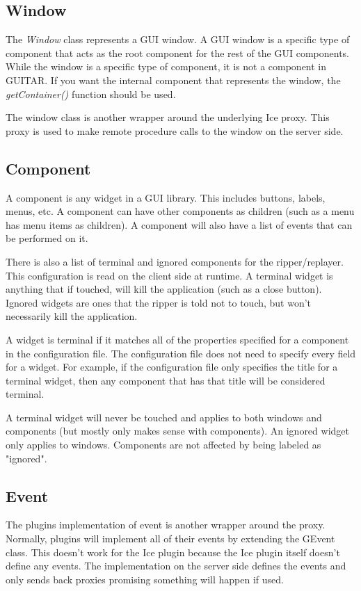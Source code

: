 \subsection{Window}

The \emph{Window} class represents a GUI window. A GUI window is a specific type of component that acts as the root component for the rest of the GUI components. While the window is a specific type of component, it is not a component in GUITAR. If you want the internal component that represents the window, the \emph{getContainer()} function should be used.

The window class is another wrapper around the underlying Ice proxy. This proxy is used to make remote procedure calls to the window on the server side.

\subsection{Component}

A component is any widget in a GUI library. This includes buttons, labels, menus, etc. A component can have other components as children (such as a menu has menu items as children). A component will also have a list of events that can be performed on it.

There is also a list of terminal and ignored components for the ripper/replayer. This configuration is read on the client side at runtime. A terminal widget is anything that if touched, will kill the application (such as a close button). Ignored widgets are ones that the ripper is told not to touch, but won't necessarily kill the application.

A widget is terminal if it matches all of the properties specified for a component in the configuration file. The configuration file does not need to specify every field for a widget. For example, if the configuration file only specifies the title for a terminal widget, then any component that has that title will be considered terminal.

A terminal widget will never be touched and applies to both windows and components (but mostly only makes sense with components). An ignored widget only applies to windows. Components are not affected by being labeled as "ignored".

\subsection{Event}

The plugins implementation of event is another wrapper around the proxy. Normally, plugins will implement all of their events by extending the GEvent class. This doesn't work for the Ice plugin because the Ice plugin itself doesn't define any events. The implementation on the server side defines the events and only sends back proxies promising something will happen if used.

